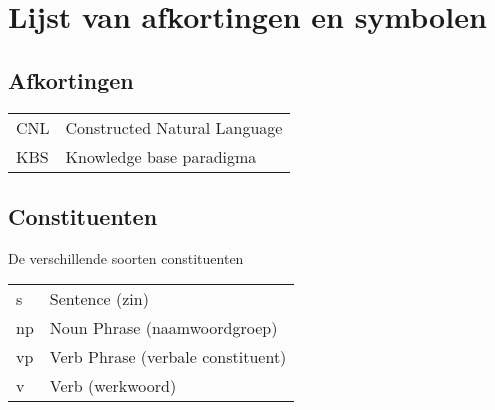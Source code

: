 \chapter{Lijst van afkortingen en symbolen}
\section*{Afkortingen}
\begin{flushleft}
  \renewcommand{\arraystretch}{1.1}
  \begin{tabularx}{\textwidth}{@{}p{12mm}X@{}}
    CNL   & Constructed Natural Language \\
    KBS   & Knowledge base paradigma \\
  \end{tabularx}
\end{flushleft}
\section*{Constituenten}
De verschillende soorten constituenten
\begin{flushleft}
  \renewcommand{\arraystretch}{1.1}
  \begin{tabularx}{\textwidth}{@{}p{12mm}X@{}}
    s     & Sentence (zin) \\
    np    & Noun Phrase (naamwoordgroep) \\
    vp    & Verb Phrase (verbale constituent) \\
    v     & Verb (werkwoord) \\
  \end{tabularx}
\end{flushleft}

